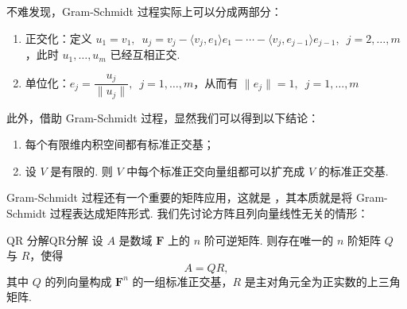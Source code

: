 不难发现，Gram-Schmidt 过程实际上可以分成两部分：
\begin{enumerate}
    \item 正交化：定义 $ u_1 = v_1 , \enspace u_j = v_j - \langle v_j, e_1 \rangle e_1 - \cdots - \langle v_j, e_{j - 1} \rangle e_{j - 1}, \enspace j = 2, \ldots , m$，此时 $u_1, \ldots , u_m$ 已经互相正交.

    \item 单位化：$ e_j = \dfrac{u_j}{\lVert u_j \rVert} , \enspace j = 1, \ldots , m$，从而有 $\lVert e_j \rVert = 1, \enspace j = 1, \ldots , m$
\end{enumerate}

此外，借助 Gram-Schmidt 过程，显然我们可以得到以下结论：
\begin{enumerate}
    \item 每个有限维内积空间都有标准正交基；

    \item 设 $ V $ 是有限的. 则 $ V $ 中每个标准正交向量组都可以扩充成 $ V $ 的标准正交基.
\end{enumerate}

Gram-Schmidt 过程还有一个重要的矩阵应用，这就是 ，其本质就是将 Gram-Schmidt 过程表达成矩阵形式. 我们先讨论方阵且列向量线性无关的情形：

\begin{theorem}{QR 分解}{QR分解}
    设 $A$ 是数域 $\mathbf{F}$ 上的 $n$ 阶可逆矩阵. 则存在唯一的 $n$ 阶矩阵 $Q$ 与 $R$，使得
    \[
        A = QR,
    \]
    其中 $Q$ 的列向量构成 $\mathbf{F}^{n}$ 的一组标准正交基，$R$ 是主对角元全为正实数的上三角矩阵.
\end{theorem}

